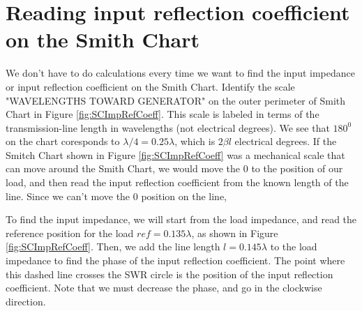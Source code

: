 \documentclass{ximera}
\begin{document}
 
\section{Reading input reflection coefficient on the Smith Chart}


We don't have to do calculations every time we want to find the input impedance or input reflection coefficient on the Smith Chart. Identify the scale "WAVELENGTHS TOWARD GENERATOR" on the outer perimeter of Smith Chart in Figure \ref{fig:SCImpRefCoeff}.  This scale is labeled in terms of the transmission-line length in wavelengths (not electrical degrees). We see that $180^0$ on the chart coresponds to $\lambda/4=0.25\lambda$, which is $2 \beta l$ electrical degrees. If the Smitch Chart shown in Figure \ref{fig:SCImpRefCoeff} was a mechanical scale that can move around the Smith Chart, we would move the 0 to the position of our load, and then read the input reflection coefficient from the known length of the line. Since we can't move the 0 position on the line,  

To find the input impedance, we will start from the load impedance, and read the reference position for the load $ref=0.135\lambda$, as shown in Figure \ref{fig:SCImpRefCoeff}. Then, we add the line length $l=0.145\lambda$ to the load impedance to find the  phase of the input reflection coefficient. The point where this dashed line crosses the SWR circle is the position of the input reflection coefficient. Note that we must decrease the phase, and go in the clockwise direction.
\end{document}
